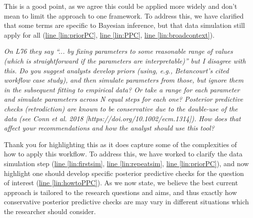 \documentclass[11pt,letter]{article}
\begin{document}
This is a good point, as we agree this could be applied more widely and don't mean to limit the approach to one framework. To address this, we have clarified that some terms are specific to Bayesian inference, but that data simulation still apply for all (\href{file:forecastflows_r1\#lintarget:priorPC}{line \ref*{lin:priorPC}}, \href{file:forecastflows_r1\#lintarget:PPC}{line \ref*{lin:PPC}}, \href{file:forecastflows_r1\#lintarget:broadcontext}{line \ref*{lin:broadcontext}}). %

\begin{mybox}
\emph{On L76 they say “... by fixing parameters to some reasonable range of values (which is straightforward if the parameters are interpretable)” but I disagree with this. Do you suggest analysts develop priors (using, e.g., Betancourt’s cited workflow case study), and then simulate parameters from those, but ignore them in the subsequent fitting to empirical data? Or take a range for each parameter and simulate parameters across N equal steps for each one? Posterior predictive checks (retrodiction) are known to be conservative due to the double-use of the data (see Conn et al. 2018 [https://doi.org/10.1002/ecm.1314]). How does that affect your recommendations and how the analyst should use this tool?}
\end{mybox}

Thank you for highlighting this as it does capture some of the complexities of how to apply this workflow. To address this, we have worked to clarify the data simulation step (\href{file:forecastflows_r1\#lintarget:firstsim}{line \ref*{lin:firstsim}}, \href{file:forecastflows_r1\#lintarget:repeatsim}{line \ref*{lin:repeatsim}}, \href{file:forecastflows_r1\#lintarget:priorPC}{line \ref*{lin:priorPC}}), and now highlight one should develop specific posterior predictive checks for the question of interest (\href{file:forecastflows_r1\#lintarget:howtoPPC}{line \ref*{lin:howtoPPC}}). As we now state, we believe the best current approach is tailored to the research questions and aims, and thus exactly how conservative posterior predictive checks are may vary in different situations which the researcher should consider. 
\end{document}
